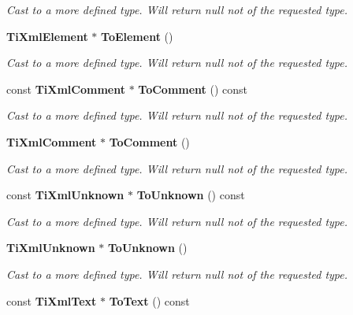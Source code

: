 \begin{CompactItemize}
\begin{CompactList}\small\item\em Cast to a more defined type. Will return null not of the requested type. \item\end{CompactList}\item 
{\bf Ti\-Xml\-Element} $\ast$ {\bf To\-Element} ()\label{classTiXmlNode_TiXmlUnknowna69}

\begin{CompactList}\small\item\em Cast to a more defined type. Will return null not of the requested type. \item\end{CompactList}\item 
const {\bf Ti\-Xml\-Comment} $\ast$ {\bf To\-Comment} () const\label{classTiXmlNode_TiXmlUnknowna70}

\begin{CompactList}\small\item\em Cast to a more defined type. Will return null not of the requested type. \item\end{CompactList}\item 
{\bf Ti\-Xml\-Comment} $\ast$ {\bf To\-Comment} ()\label{classTiXmlNode_TiXmlUnknowna71}

\begin{CompactList}\small\item\em Cast to a more defined type. Will return null not of the requested type. \item\end{CompactList}\item 
const {\bf Ti\-Xml\-Unknown} $\ast$ {\bf To\-Unknown} () const\label{classTiXmlNode_TiXmlUnknowna72}

\begin{CompactList}\small\item\em Cast to a more defined type. Will return null not of the requested type. \item\end{CompactList}\item 
{\bf Ti\-Xml\-Unknown} $\ast$ {\bf To\-Unknown} ()\label{classTiXmlNode_TiXmlUnknowna73}

\begin{CompactList}\small\item\em Cast to a more defined type. Will return null not of the requested type. \item\end{CompactList}\item 
const {\bf Ti\-Xml\-Text} $\ast$ {\bf To\-Text} () const\label{classTiXmlNode_TiXmlUnknowna74}


\end{CompactItemize}
